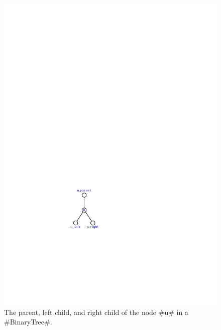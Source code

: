 \begin{figure}
  \begin{center}
    \includegraphics[scale=0.90909]{figs/bintree-traverse-1} 
  \end{center}
  \caption[Parent, left child, and right child]{The parent, left child, and right child of the node #u#
    in a #BinaryTree#.}
\end{figure}


